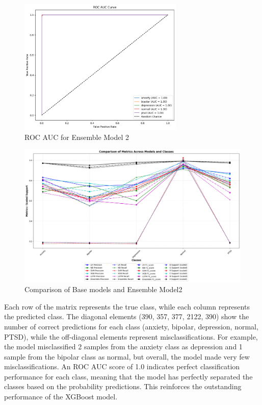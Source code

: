 \begin{figure}[h!]  
    \centering
    \includegraphics[width=0.7\textwidth]{Images/EM2 ROC.png}  
    \caption{ROC AUC for Ensemble Model 2}
    \label{em2 roc}  %
\end{figure}

\begin{figure}[h!]  
    \centering
    \includegraphics[width=1.0\textwidth]{Images/EM2 RESULT.png}  
    \caption{Comparison of Base models and Ensemble Model2}
    \label{lstm arch}  %
\end{figure}

\noindent
Each row of the matrix represents the true class, while each column represents the predicted class. The diagonal elements (390, 357, 377, 2122, 390) show the number of correct predictions for each class (anxiety, bipolar, depression, normal, PTSD), while the off-diagonal elements represent misclassifications. For example, the model misclassified 2 samples from the anxiety class as depression and 1 sample from the bipolar class as normal, but overall, the model made very few misclassifications. An ROC AUC score of 1.0 indicates perfect classification performance for each class, meaning that the model has perfectly separated the classes based on the probability predictions. This reinforces the outstanding performance of the XGBoost model.

